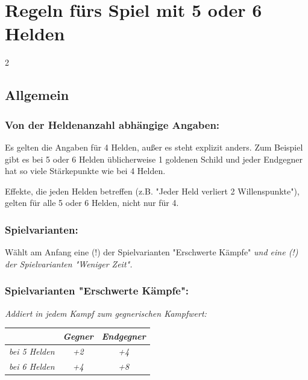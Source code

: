 \documentclass[10pt, a4paper, oneside]{book}
\newcommand{\fan}[1]{\textit{#1}}
\begin{document}
\chapter{Regeln fürs Spiel mit 5 oder 6 Helden}
\label{5-oder-6-helden}


\begin{multicols*}{2}\raggedcolumns


\begin{nobgcolor}

\section{Allgemein}



\subsection{Von der Heldenanzahl abhängige Angaben:}

Es gelten die Angaben für 4 Helden, außer es steht explizit anders. 
Zum Beispiel gibt es bei 5 oder 6 Helden üblicherweise 1 goldenen Schild und jeder Endgegner hat so viele Stärkepunkte wie bei 4 Helden.
\supercite{nh-begleitheft,dh-begleitheft,mh-begleitheft,bibo-bonus-heft}

Effekte, die jeden Helden betreffen (z.B. "Jeder Held verliert 2 Willenspunkte"), gelten für alle 5 oder 6 Helden, nicht nur für 4.




\subsection{Spielvarianten:}

Wählt am Anfang eine (!) der Spielvarianten "Erschwerte Kämpfe"\supercite{ag-begleitheft,dz-begleitheft} \fan{und eine (!) der Spielvarianten "Weniger Zeit".}



\subsection{Spielvarianten "Erschwerte Kämpfe":}

\bullet{} \fan{Addiert in jedem Kampf zum gegnerischen Kampfwert:}

\begin{tabular}{|c|c|c|}
    \hline
    & \fan{Gegner}
    & \fan{Endgegner}
    \\
    \hline
    \fan{bei 5 Helden}
    & \fan{+2}
    & \fan{+4}
    \\
    \hline
    \fan{bei 6 Helden}
    & \fan{+4}
    & \fan{+8}
    \\
    \hline
\end{tabular}



\end{nobgcolor}
\end{multicols*}
\end{document}
